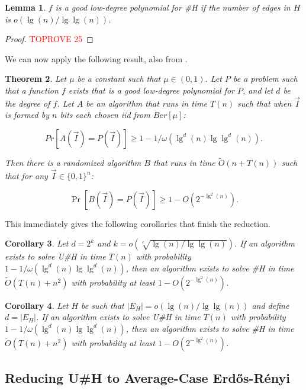 \documentclass[11pt,letterpaper,pdftex]{article}
\newtheorem{theorem}{Theorem}[section]
\newtheorem{lemma}[theorem]{Lemma}
\newtheorem{corollary}[theorem]{Corollary}
\def\Otil{\tilde{O}}
\begin{document}
\begin{lemma}\label{lem: f GLDP}
$f$ is a good low-degree polynomial for \#H if the number of edges in $H$ is $o(\lg(n)/\lg\lg(n))$.
\end{lemma}
\begin{proof}\textcolor{red}{TOPROVE 25}\end{proof}

We can now apply the following result, also from \cite{factoredProblems}.

\begin{theorem}\cite{factoredProblems}\label{thm: GLDP}
Let $\mu$ be a constant such that $\mu\in(0,1)$. Let $P$ be a problem such that a function $f$ exists that is a good low-degree polynomial for $P$, and let $d$ be the degree of $f$. Let $A$ be an algorithm that runs in time $T(n)$ such that when $\Vec{I}$ is formed by $n$ bits each chosen iid from $Ber[\mu]$:

\[
Pr[A(\Vec{I}) = P(\Vec{I})]\geq 1-1/\omega\left(\lg^d(n)\lg\lg^d(n)\right).
\]

Then there is a randomized algorithm $B$ that runs in time $\Otil(n+T(n))$ such that for any $\Vec I\in\{0,1\}^n$:

\[
\Pr[B(\Vec I) = P(\Vec I)]\geq 1 - O\left(2^{-\lg^2(n)}\right).
\]
\end{theorem}

This immediately gives the following corollaries that finish the reduction.

\begin{corollary}
Let $d=2^k$ and $k=o(\sqrt[c]{\lg(n)/\lg\lg(n) })$. If an algorithm exists to solve U\#H in time $T(n)$ with probability $1-1/\omega(\lg^d(n)\lg\lg^d(n) )$, then an algorithm exists to solve \#H in time $\Otil(T(n) + n^2)$ with probability at least $1-O \left(2^ {-\lg^2(n)}\right)$.
\end{corollary}

\begin{corollary}\label{H TO UH}
Let $ H $ be such that $|E_H|=o(\lg(n)/\lg\lg(n) )$ and define $d = |E_H|$. If an algorithm exists to solve U\#H in time $T(n)$ with probability $1-1/\omega(\lg^d(n)\lg\lg^d(n) )$, then an algorithm exists to solve \#H in time $\Otil(T(n) + n^2)$ with probability at least $1-O \left(2^ {-\lg^2(n)}\right)$.
\end{corollary}

\subsection{Reducing U\#H to Average-Case Erd{\H{o}}s-R{\'{e}}nyi}
\end{document}
